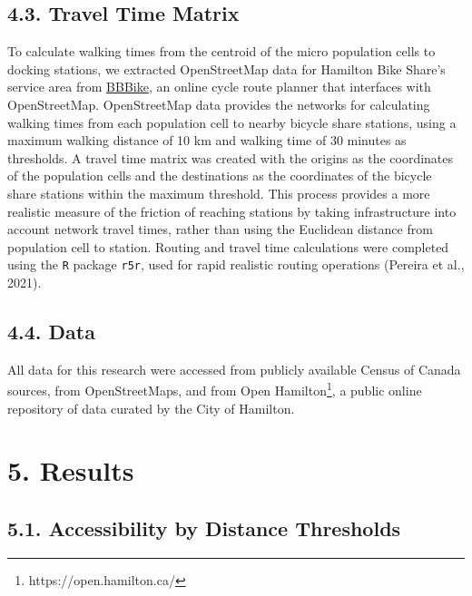 \documentclass[]{elsarticle} %
\begin{document}
\hypertarget{travel-time-matrix}{%
\subsection{4.3. Travel Time Matrix}\label{travel-time-matrix}}

To calculate walking times from the centroid of the micro population
cells to docking stations, we extracted OpenStreetMap data for Hamilton
Bike Share's service area from
\href{https://download.bbbike.org/osm/bbbike/}{BBBike}, an online cycle
route planner that interfaces with OpenStreetMap. OpenStreetMap data
provides the networks for calculating walking times from each population
cell to nearby bicycle share stations, using a maximum walking distance
of 10 km and walking time of 30 minutes as thresholds. A travel time
matrix was created with the origins as the coordinates of the population
cells and the destinations as the coordinates of the bicycle share
stations within the maximum threshold. This process provides a more
realistic measure of the friction of reaching stations by taking
infrastructure into account network travel times, rather than using the
Euclidean distance from population cell to station. Routing and travel
time calculations were completed using the \texttt{R} package
\texttt{r5r}, used for rapid realistic routing operations (Pereira et
al., 2021).

\hypertarget{data}{%
\subsection{4.4. Data}\label{data}}

All data for this research were accessed from publicly available Census
of Canada sources, from OpenStreetMaps, and from Open Hamilton\footnote{https://open.hamilton.ca/},
a public online repository of data curated by the City of Hamilton.

\hypertarget{results}{%
\section{5. Results}\label{results}}

\hypertarget{accessibility-by-distance-thresholds}{%
\subsection{5.1. Accessibility by Distance
Thresholds}\label{accessibility-by-distance-thresholds}}
\end{document}
